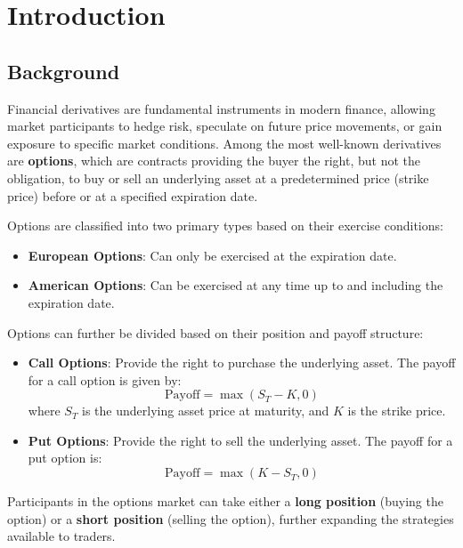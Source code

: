 \documentclass[12pt,a4paper]{report}
\begin{document}
\tableofcontents
\newpage

\chapter{Introduction}

\section{Background}
Financial derivatives are fundamental instruments in modern finance, allowing market participants to hedge risk, speculate on future price movements, or gain exposure to specific market conditions. Among the most well-known derivatives are \textbf{options}, which are contracts providing the buyer the right, but not the obligation, to buy or sell an underlying asset at a predetermined price (strike price) before or at a specified expiration date.

Options are classified into two primary types based on their exercise conditions:
\begin{itemize}
    \item \textbf{European Options}: Can only be exercised at the expiration date.
    \item \textbf{American Options}: Can be exercised at any time up to and including the expiration date.
\end{itemize}

Options can further be divided based on their position and payoff structure:
\begin{itemize}
    \item \textbf{Call Options}: Provide the right to purchase the underlying asset. The payoff for a call option is given by:
    \[
    \text{Payoff} = \max(S_T - K, 0)
    \]
    where \(S_T\) is the underlying asset price at maturity, and \(K\) is the strike price.
    \item \textbf{Put Options}: Provide the right to sell the underlying asset. The payoff for a put option is:
    \[
    \text{Payoff} = \max(K - S_T, 0)
    \]
\end{itemize}

Participants in the options market can take either a \textbf{long position} (buying the option) or a \textbf{short position} (selling the option), further expanding the strategies available to traders.
\end{document}

